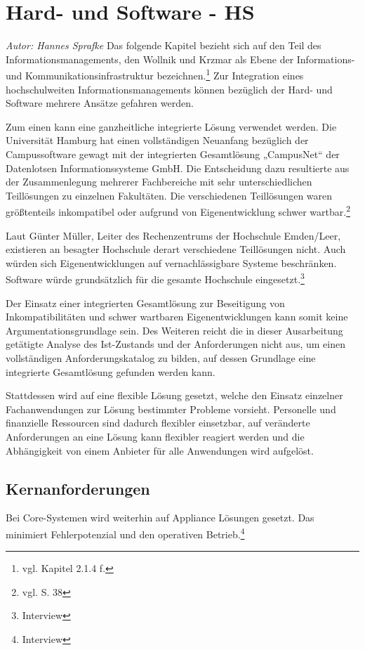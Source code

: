 \section{Hard- und Software - HS}
\textit{Autor: Hannes Sprafke}
Das folgende Kapitel bezieht sich auf den Teil des Informationsmanagements, den Wollnik und Krzmar als Ebene der Informations- und Kommunikationsinfrastruktur bezeichnen.\footnote{vgl. Kapitel 2.1.4 f.} Zur Integration eines hochschulweiten Informationsmanagements können bezüglich der Hard- und Software mehrere Ansätze gefahren werden.

Zum einen kann eine ganzheitliche integrierte Lösung verwendet werden. Die Universität Hamburg hat einen vollständigen Neuanfang bezüglich der Campussoftware gewagt mit der integrierten Gesamtlösung „CampusNet“ der Datenlotsen Informationssysteme GmbH. Die Entscheidung dazu resultierte aus der Zusammenlegung mehrerer Fachbereiche mit sehr unterschiedlichen Teillösungen zu einzelnen Fakultäten. Die verschiedenen Teillösungen waren größtenteils inkompatibel oder aufgrund von Eigenentwicklung schwer wartbar.\footnote {vgl. \cite{dini_webportale_2007} S. 38}

Laut Günter Müller, Leiter des Rechenzentrums der Hochschule Emden/Leer, existieren an besagter Hochschule derart verschiedene Teillösungen nicht. Auch würden sich Eigenentwicklungen auf vernachlässigbare Systeme beschränken. Software würde grundsätzlich für die gesamte Hochschule eingesetzt.\footnote{Interview}

Der Einsatz einer integrierten Gesamtlösung zur Beseitigung von Inkompatibilitäten und schwer wartbaren Eigenentwicklungen kann somit keine Argumentationsgrundlage sein.
Des Weiteren reicht die in dieser Ausarbeitung getätigte Analyse des Ist-Zustands und der Anforderungen nicht aus, um einen vollständigen Anforderungskatalog zu bilden, auf dessen Grundlage eine integrierte Gesamtlösung gefunden werden kann.

Stattdessen wird auf eine flexible Lösung gesetzt, welche den Einsatz einzelner Fachanwendungen zur Lösung bestimmter Probleme vorsieht. Personelle und finanzielle Ressourcen sind dadurch flexibler einsetzbar, auf veränderte Anforderungen an eine Lösung kann flexibler reagiert werden und die Abhängigkeit von einem Anbieter für alle Anwendungen wird aufgelöst.

\subsection{Kernanforderungen}
Bei Core-Systemen wird weiterhin auf Appliance Lösungen gesetzt. Das minimiert Fehlerpotenzial und den operativen Betrieb.\footnote{Interview}

